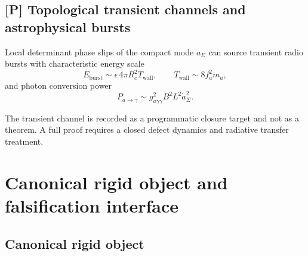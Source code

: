 \subsection{[P] Topological transient channels and astrophysical bursts}

\begin{conjecture}
\label{conj:topological_phase_slip_burst_channel}
Local determinant phase slips of the compact mode \(a_\Sigma\) can source transient
radio bursts with characteristic energy scale
\[
E_{\mathrm{burst}}\sim \epsilon\,4\pi R_c^2T_{\mathrm{wall}},
\qquad
T_{\mathrm{wall}}\sim 8f_a^2m_a,
\]
and photon conversion power
\[
P_{a\to\gamma}\sim g_{a\gamma\gamma}^2B^2L^2\dot a_\Sigma^2.
\]
\end{conjecture}

\begin{remark}
The transient channel is recorded as a programmatic closure target and not as a theorem. A full
proof requires a closed defect dynamics and radiative transfer treatment.
\end{remark}

\section{Canonical rigid object and falsification interface}

\subsection{Canonical rigid object}

